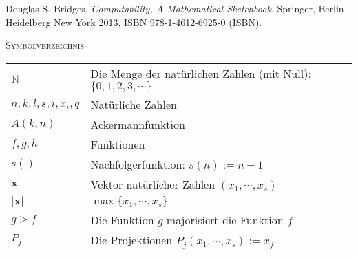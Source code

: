 \documentclass[a4paper]{amsart}
\theoremstyle{definition}
\newcommand{\N}{\ensuremath{\mathbb{ N }}}
\newcommand{\bb}[1]{\mathbf{#1}}
\begin{document}
\begin{thebibliography}{9}

      Douglas S. Bridges, \emph{Computability, A Mathematical Sketchbook},
      Springer, Berlin Heidelberg New York 2013, ISBN 978-1-4612-6925-0 (ISBN).

\end{thebibliography}

\begin{large}
    \centerline{\textsc{Symbolverzeichnis}}
\end{large}
\bigskip

\renewcommand*{\arraystretch}{1}

\begin{tabular}{ll}
    $\N$                    & Die Menge der natürlichen Zahlen (mit Null): $\{ 0, 1, 2, 3, \cdots \}$\\
    $n, k, l, s, i, x_i, q$ & Natürliche Zahlen\\
    $A( k, n )$             & Ackermannfunktion\\
    $f, g, h$               & Funktionen\\
    $s()$                   & Nachfolgerfunktion: $s(n) := n+1$\\
    $\bb{x}$                & Vektor natürlicher Zahlen $(x_1, \cdots, x_s)$\\
    $|\bb{x}|$              & $\max \{x_1, \cdots, x_s \}$\\
    $g > f$                 & Die Funktion $g$ majorisiert die Funktion $f$\\
    $P_j$                   & Die Projektionen $P_j(x_1, \cdots, x_s ) := x_j$
\end{tabular}
\end{document}
